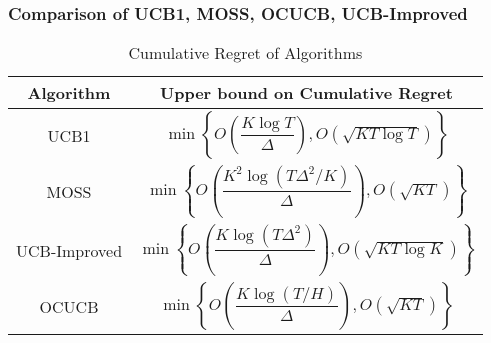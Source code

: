 \begin{frame}
\frametitle{Comparison of UCB1, MOSS, OCUCB, UCB-Improved}
\begin{table}
\caption{Cumulative Regret of Algorithms}
\begin{center}
\begin{tabular}{|c|c|}
\toprule
Algorithm  & Upper bound on Cumulative Regret\\
\midrule
UCB1        &$\min\left \lbrace O\left(\dfrac{K\log T}{\Delta} \right), O\left( \sqrt{KT\log T}\right) \right\rbrace$ \\\midrule
MOSS        &$\min\left \lbrace O\left(\dfrac{K^2\log (T\Delta^2/K)}{\Delta} \right), O\left( \sqrt{KT}\right) \right\rbrace$ \\\midrule
UCB-Improved      &$\min\left \lbrace O\left(\dfrac{K\log (T\Delta^2)}{\Delta} \right), O\left( \sqrt{KT\log K}\right) \right\rbrace$\\\midrule
OCUCB        &$\min\left \lbrace O\left(\dfrac{K\log (T/H)}{\Delta} \right), O\left( \sqrt{KT}\right) \right\rbrace$ \\\bottomrule
\end{tabular}
\end{center}
\end{table}
\end{frame}

